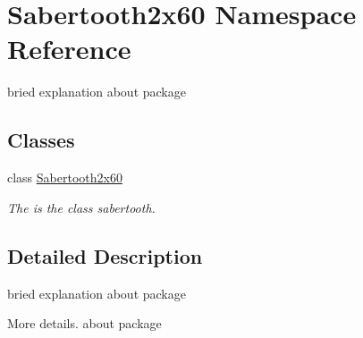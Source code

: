 \hypertarget{namespaceSabertooth2x60}{}\section{Sabertooth2x60 Namespace Reference}
\label{namespaceSabertooth2x60}


bried explanation about package  


\subsection*{Classes}
\begin{DoxyCompactItemize}
\item 
class \hyperlink{classSabertooth2x60_1_1Sabertooth2x60}{Sabertooth2x60}
\begin{DoxyCompactList}\small\item\em The is the class sabertooth. \end{DoxyCompactList}\end{DoxyCompactItemize}


\subsection{Detailed Description}
bried explanation about package 

More details. about package 